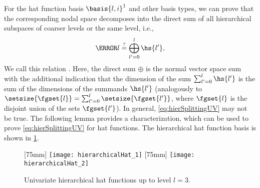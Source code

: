 For the hat function basis $\basis{l,i}^1$ and other basis types,
we can prove that the corresponding nodal space
decomposes into the direct sum of all
hierarchical subspaces of coarser levels or the same level, i.e.,
\begin{equation}
  \label{eq:hierSplittingUV}
  \ns{l}
  \overset{?}{=} \bigoplus_{l'=0}^l \hs{l'},
\end{equation}
We call this relation .
Here, the direct sum $\oplus$ is
the normal vector space sum with the additional indication
that the dimension of the sum $\sum_{l'=0}^l \hs{l'}$ is the sum
of the dimensions of the summands $\hs{l'}$
(analogously to $\setsize{\fgset{l}} = \sum_{l'=0}^l \setsize{\fgset{l'}}$,
where $\fgset{l}$ is the disjoint union of the sets $\fgset{l'}$).
In general, \eqref{eq:hierSplittingUV} may not be true.
The following lemma provides a characterization,
which can be used to prove \eqref{eq:hierSplittingUV} for hat functions.
The hierarchical hat function basis is shown in \cref{fig:hierarchicalHat}.

\begin{figure}
  [75mm]{%
    \texttt{[image: hierarchicalHat\_1]}%
  }%
  \hfill%
  [75mm]{%
    \texttt{[image: hierarchicalHat\_2]}%
  }%
  \caption{Univariate hierarchical hat functions up to level $l = 3$.}
  \label{fig:hierarchicalHat}
\end{figure}

